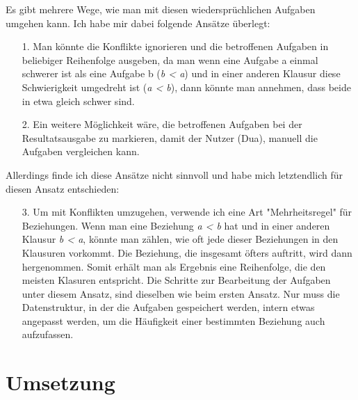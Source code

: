 \documentclass[a4paper,10pt,ngerman]{scrartcl}
\begin{document}
Es gibt mehrere Wege, wie man mit diesen wiedersprüchlichen Aufgaben umgehen kann. Ich habe mir dabei folgende Ansätze überlegt:
\begin{itemize}
  \item[1.] Man könnte die Konflikte ignorieren und die betroffenen Aufgaben in beliebiger Reihenfolge ausgeben, da man wenn eine Aufgabe a einmal schwerer ist als eine Aufgabe b (\textit{b < a}) und in einer anderen Klausur diese
  Schwierigkeit umgedreht ist (\textit{a < b}), dann könnte man annehmen, dass beide in etwa gleich schwer sind. 
  \item[2.] Ein weitere Möglichkeit wäre, die betroffenen Aufgaben bei der Resultatsausgabe zu markieren, damit der Nutzer (Dua), manuell die Aufgaben vergleichen kann. 
\end{itemize}
Allerdings finde ich diese Ansätze nicht sinnvoll und habe mich letztendlich für diesen Ansatz entschieden:
\begin{itemize}
  \item[3.] Um mit Konflikten umzugehen, verwende ich eine Art "Mehrheitsregel" für Beziehungen. Wenn man eine Beziehung \textit{a < b} hat und in einer anderen Klausur \textit{b < a}, könnte man zählen, wie oft jede dieser
  Beziehungen in den Klausuren vorkommt. Die Beziehung, die insgesamt öfters auftritt, wird dann hergenommen. Somit erhält man als Ergebnis eine Reihenfolge, die den meisten Klasuren entspricht.
  \newline
  Die Schritte zur Bearbeitung der Aufgaben unter diesem Ansatz, sind dieselben wie beim ersten Ansatz. Nur muss die Datenstruktur, in der die Aufgaben gespeichert werden, intern etwas angepasst werden, um die Häufigkeit einer
  bestimmten Beziehung auch aufzufassen.
\end{itemize}


\section{Umsetzung}
\end{document}
